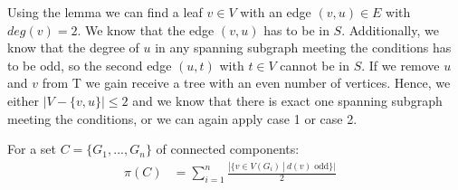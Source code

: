 \documentclass[a4paper]{article}
\begin{document}
\begin{solution}{6}
\begin{itemize}
		Using the lemma we can find a leaf $v \in V$ with an edge $(v,u) \in E$ with $deg(v)=2$. 
		We know that the edge $(v,u)$ has to be in $S$. 
		Additionally, we know that the degree of $u$ in any spanning subgraph meeting the conditions has to be odd, so the second edge $(u,t)$ with $t \in V$ cannot be in $S$. 
		If we remove $u$ and $v$ from T we gain receive a tree with an even number of vertices. 
		Hence, we either $|V- \{v,u\}| \leq 2$ and we know that there is exact one spanning subgraph meeting the conditions, or we can again apply case 1 or case 2. 
	\end{itemize}	 
	
	
	\end{solution} 
	\newpage
	\begin{solution}{7}
		For a set $C = \{G_1, ..., G_n\}$ of connected components:\\
		\begin{align}
			\pi(C)&= \sum_{i = 1}^n \frac{|\{v \in V(G_i)\ |\ d(v) \text{ odd}\}|}{2}&
		\end{align}
	\end{solution} 
	\newpage
	\begin{solution}{8}
		
	\end{solution}
	
\end{document}
